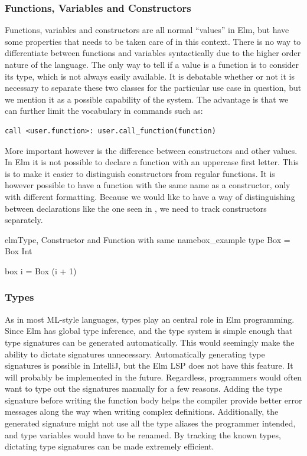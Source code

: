 \documentclass[../thesis.tex]{subfiles}
\begin{document}
\subsubsection{Functions, Variables and Constructors}%
\label{par:functions_and_variables}
Functions, variables and constructors are all normal ``values'' in Elm, but have some properties
that needs to be taken care of in this context.
There is no way to differentiate between functions and variables syntactically due to the higher order nature of the language.
The only way to tell if a value is a function is to consider its type, which is not always easily available.
It is debatable whether or not it is necessary to separate these two classes for the particular use case in question,
but we mention it as a possible capability of the system.
The advantage is that we can further limit the vocabulary in commands such as:
\begin{verbatim}
call <user.function>: user.call_function(function)
\end{verbatim}
More important however is the difference between constructors and other values.
In Elm it is not possible to declare a function with an uppercase first letter.
This is to make it easier to distinguish constructors from regular functions.
It is however possible to have a function with the same name as a constructor, only with different formatting.
Because we would like to have a way of distinguishing between declarations like the one seen in ,
we need to track constructors separately.
\begin{code}{elm}{Type, Constructor and Function with same name}{box_example}
type Box = Box Int

box i = Box (i + 1) 
\end{code}

\subsubsection{Types}%
\label{par:types}
As in most ML-style languages, types play an central role in Elm programming.
Since Elm has global type inference, and the type system is simple enough that
type signatures can be generated
automatically.
This would seemingly make the ability to dictate signatures unnecessary.
Automatically generating type signatures is possible in IntelliJ, but the Elm LSP does not have this feature. 
It will probably be implemented in the future.
Regardless, programmers would often want to type out the signatures manually for a few reasons.
Adding the type signature before writing the function body helps the compiler provide better
error messages along the way when writing complex definitions.
Additionally, the generated signature might not use all the type aliases the programmer intended, and
type variables would have to be renamed.
By tracking the known types, dictating type signatures can be made extremely efficient.
\end{document}
